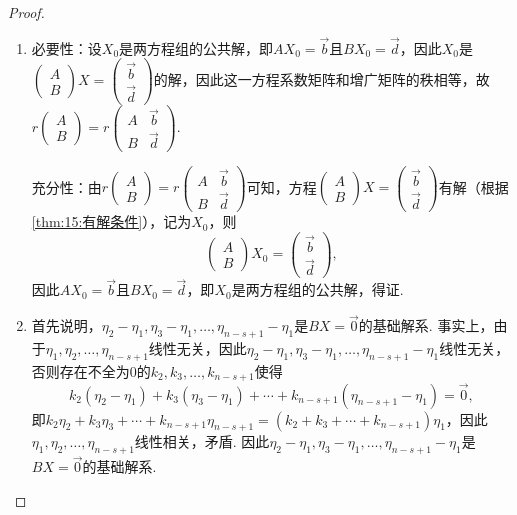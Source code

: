 \begin{proof}
    \begin{enumerate}
        \item 必要性：设$X_0$是两方程组的公共解，即$AX_0=\vec{b}$且$BX_0=\vec{d}$，因此$X_0$是$\begin{pmatrix}
                      A \\ B
                  \end{pmatrix}X=\begin{pmatrix}
                      \vec{b} \\ \vec{d}
                  \end{pmatrix}$的解，因此这一方程系数矩阵和增广矩阵的秩相等，故$r\begin{pmatrix}
                      A \\ B
                    \end{pmatrix}=r\begin{pmatrix}
                        A & \vec{b} \\ B & \vec{d}
                    \end{pmatrix}$.

        充分性：由$r\begin{pmatrix}
            A \\ B
          \end{pmatrix}=r\begin{pmatrix}
              A & \vec{b} \\ B & \vec{d}
          \end{pmatrix}$可知，方程$\begin{pmatrix}
            A \\ B
        \end{pmatrix}X=\begin{pmatrix}
            \vec{b} \\ \vec{d}
        \end{pmatrix}$有解（根据\autoref{thm:15:有解条件}），记为$X_0$，则
        \[\begin{pmatrix}
            A \\ B
        \end{pmatrix}X_0=\begin{pmatrix}
            \vec{b} \\ \vec{d}
        \end{pmatrix},\]
        因此$AX_0=\vec{b}$且$BX_0=\vec{d}$，即$X_0$是两方程组的公共解，得证.

        \item 首先说明，$\eta_2-\eta_1,\eta_3-\eta_1,\ldots,\eta_{n-s+1}-\eta_1$是$BX=\vec{0}$的基础解系. 事实上，由于$\eta_1,\eta_2,\ldots,\eta_{n-s+1}$线性无关，因此$\eta_2-\eta_1,\eta_3-\eta_1,\ldots,\eta_{n-s+1}-\eta_1$线性无关，否则存在不全为0的$k_2,k_3,\ldots,k_{n-s+1}$使得
        \[k_2(\eta_2-\eta_1)+k_3(\eta_3-\eta_1)+\cdots+k_{n-s+1}(\eta_{n-s+1}-\eta_1)=\vec{0},\]
        即$k_2\eta_2+k_3\eta_3+\cdots+k_{n-s+1}\eta_{n-s+1}=(k_2+k_3+\cdots+k_{n-s+1})\eta_1$，因此$\eta_1,\eta_2,\ldots,\eta_{n-s+1}$线性相关，矛盾. 因此$\eta_2-\eta_1,\eta_3-\eta_1,\ldots,\eta_{n-s+1}-\eta_1$是$BX=\vec{0}$的基础解系.


\end{enumerate}
\end{proof}
